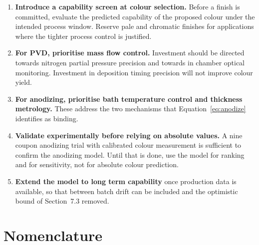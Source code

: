 \documentclass[11pt,a4paper]{article}
\begin{document}
\begin{enumerate}[leftmargin=1.6em, itemsep=5pt]

\item \textbf{Introduce a capability screen at colour selection.} Before a
finish is committed, evaluate the predicted capability of the proposed colour
under the intended process window. Reserve pale and chromatic finishes for
applications where the tighter process control is justified.

\item \textbf{For PVD, prioritise mass flow control.} Investment should be
directed towards nitrogen partial pressure precision and towards in chamber
optical monitoring. Investment in deposition timing precision will not improve
colour yield.

\item \textbf{For anodizing, prioritise bath temperature control and thickness
metrology.} These address the two mechanisms that
Equation~\eqref{eq:anodize} identifies as binding.

\item \textbf{Validate experimentally before relying on absolute values.} A
nine coupon anodizing trial with calibrated colour measurement is sufficient to
confirm the anodizing model. Until that is done, use the model for ranking and
for sensitivity, not for absolute colour prediction.

\item \textbf{Extend the model to long term capability} once production data is
available, so that between batch drift can be included and the optimistic bound
of Section~7.3 removed.

\end{enumerate}

\appendix

\section{Nomenclature}
\end{document}

